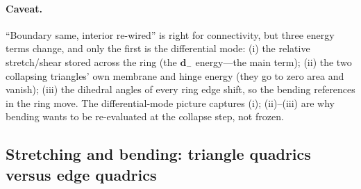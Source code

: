 \paragraph{Caveat.}
``Boundary same, interior re-wired'' is right for connectivity, but three energy terms change, and only the first is the differential mode: (i) the relative stretch/shear stored across the ring (the $\mathbf{d}_-$ energy---the main term); (ii) the two collapsing triangles' own membrane and hinge energy (they go to zero area and vanish); (iii) the dihedral angles of every ring edge shift, so the bending references in the ring move.
The differential-mode picture captures (i); (ii)--(iii) are why bending wants to be re-evaluated at the collapse step, not frozen.

\subsection{Stretching and bending: triangle quadrics versus edge quadrics}

